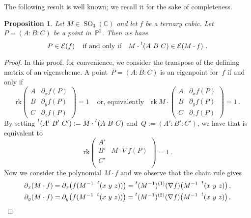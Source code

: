\documentclass[a4paper, 11pt, reqno]{amsart}
\theoremstyle{plain}
\newtheorem{prop}[lemma]{Proposition}
\theoremstyle{definition}
\newcommand{\C}{\mathbb{C}}
\newcommand{\p}{\mathbb{P}}
\newcommand{\de}{\partial}
\newcommand{\rk}{\ensuremath{\mathrm{rk}}}
\newcommand{\SO}{\operatorname{SO}}
\newcommand{\Eig}[1]{\mathcal{E}\!\left( {#1} \right)}
\begin{document}
The following result is well known; we recall it for the sake of completeness.

\begin{prop}
Let $M \in \SO_3(\C)$ and let $f$ be a ternary cubic.
Let $P = (A: B: C)$ be a point in~$\p^2$.
Then we have
%
\[
  P \in \Eig{f}
  \quad \text{if and only if} \quad
  M \cdot \prescript{t} {}(A \ B \ C) \in \Eig{M \cdot f} \,.
\]
%
\end{prop}
\begin{proof}
In this proof, for convenience,
we consider the transpose of the defining matrix of an eigenscheme.
A point~$P = (A: B: C)$ is an eigenpoint for~$f$ if and only if
%
\begin{equation}
\label{eq:def_matrix_M}
  \mathrm{rk}
  \begin{pmatrix}
    A & \de_x f(P) \\
    B & \de_y f(P) \\
    C & \de_z f(P)
  \end{pmatrix}
  = 1 \,
 \quad \text{or, equivalently} \quad
  \mathrm{rk} \ M \cdot
  \begin{pmatrix}
    A & \de_x f(P) \\
    B & \de_y f(P) \\
    C & \de_z f(P)
  \end{pmatrix}
  = 1 \,.
\end{equation}
%
By setting $\prescript{t} {}(A' \ B' \ C' ) := M \cdot \prescript{t} {}(A \ B \ C) $ and~$Q := (A':B':C')$, we have that 
is equivalent to
%
\begin{equation}
\label{eq:transformed}
  \rk
  \begin{pmatrix}
    A' & \\
    B' & M \cdot \nabla f (P) \\
    C' & \\
  \end{pmatrix}
  = 1 \,.
\end{equation}
%
Now we consider the polynomial $M \cdot f$ and we observe that the chain rule gives
%
\begin{gather*}
  \partial_x (M\cdot f) = \partial_x \bigl( f(M^{-1} \ \prescript{t} {} (x \ y \ z)) \bigr) = \prescript{t} {}(M^{-1})^{(1)}(\nabla f) \bigl( M^{-1}\ \prescript{t} {} (x \ y \ z) \bigr) \,, \\
  \partial_y (M\cdot f) = \partial_y \bigl( f(M^{-1} \ \prescript{t} {} (x \ y \ z)) \bigr) = \prescript{t} {}(M^{-1})^{(2)}(\nabla f) \bigl( M^{-1}\ \prescript{t} {} (x \ y \ z) \bigr) \,, \\

\end{gather*}
\end{proof}
\end{document}
